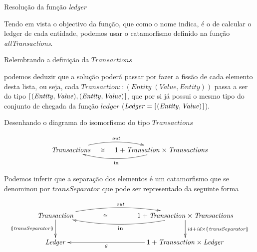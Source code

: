 \documentclass[a4paper]{article}
\newcommand{\Conid}[1]{\mathit{#1}}
\newcommand{\Varid}[1]{\mathit{#1}}
\def\resethooks{%
  \global\let\SaveRestoreHook\empty
  \global\let\ColumnHook\empty}
\let\hspre\empty
\let\hspost\empty
\begin{document}
\begin{center}
\large {Resolução da função \emph{ledger}}
\end{center}
\par Tendo em vista o objectivo da função, que como o nome indica, é o de calcular o ledger de cada entidade, 
podemos usar o catamorfismo definido na função \emph{allTransactions}. 
\par Relembrando a definição da \ensuremath{\Conid{Transactions}}

\resethooks

podemos deduzir que a solução poderá passar por fazer a fissão de cada elemento desta lista, ou seja, 
cada \ensuremath{\Conid{Transaction}\mathbin{::}(\Conid{Entity}\;(\Conid{Value},\Conid{Entity}))} passa a ser do tipo \ensuremath{[\mskip1.5mu (\Conid{Entity},\Conid{Value}),(\Conid{Entity},\Conid{Value})\mskip1.5mu]},
que por si já possui o mesmo tipo do conjunto de chegada da função \ensuremath{\Varid{ledger}} (\ensuremath{\Conid{Ledger}\mathrel{=}[\mskip1.5mu (\Conid{Entity},\Conid{Value})\mskip1.5mu]}).
\par Desenhando o diagrama do isomorfismo do tipo \ensuremath{\Conid{Transactions}}

\begin{eqnarray*}
\xymatrix@C=1cm{
    \ensuremath{\Conid{Transactions}} 
    \ar@/^1pc/[r]^{\ensuremath{\Varid{out}}}
    \ar@{}[r]|-{\cong}
&
    \ensuremath{\mathrm{1}\mathbin{+}\Conid{Transation}\times\Conid{Transactions}} 
    \ar@/^1pc/[l]^{\ensuremath{\mathbf{in}}}
}
\end{eqnarray*}

\par Podemos inferir que a separação dos elementos é um catamorfismo que se denominou por \ensuremath{\Varid{transSeparator}}
que pode ser representado da seguinte forma

\begin{eqnarray*}
\xymatrix@C=3cm{
    \ensuremath{\Conid{Transaction}} 
    \ar[d]_-{\ensuremath{\cata{\Varid{transSeparator}}}}
    \ar@/^1pc/[r]^{\ensuremath{\Varid{out}}}
    \ar@{}[r]|-{\cong}
&
    \ensuremath{\mathrm{1}\mathbin{+}\Conid{Transaction}\times\Conid{Transactions}} 
    \ar[d]^{\ensuremath{\Varid{id}\mathbin{+}\Varid{id}\times\cata{\Varid{transSeparator}}}}
    \ar@/^1pc/[l]^{\ensuremath{\mathbf{in}}}
\\
     \ensuremath{\Conid{Ledger}} 
& \ensuremath{\mathrm{1}\mathbin{+}\Conid{Transaction}\times\Conid{Ledger}} 
    \ar[l]^-{\ensuremath{\Varid{g}}}
} 
\end{eqnarray*}
\end{document}

